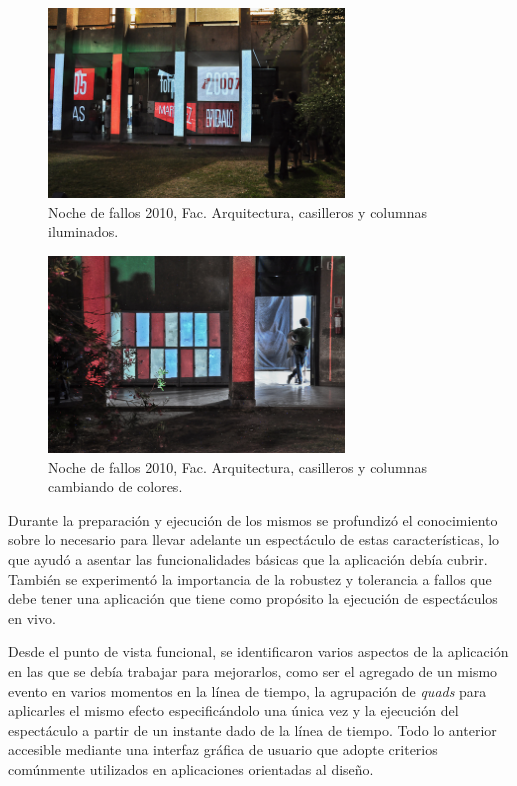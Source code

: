 \begin{figure}[H]
  \centering
    \includegraphics[width=0.7\textwidth]{./Cap7_conclusiones/Arqui2.jpg}
  \caption[http://www.farq.edu.uy/patio/conferencias-exposiciones-y-seminarios/noche-de-fallos-7.html]{Noche de fallos 2010, Fac. Arquitectura, casilleros y columnas iluminados.}
  \label{fig:Arquitectura2}
\end{figure}

\begin{figure}[H]
  \centering
    \includegraphics[width=0.7\textwidth]{./Cap7_conclusiones/Arqui3.jpg}
  \caption[http://www.farq.edu.uy/patio/conferencias-exposiciones-y-seminarios/noche-de-fallos-7.html]{Noche de fallos 2010, Fac. Arquitectura, casilleros y columnas cambiando de colores.}
  \label{fig:Arquitectura3}
\end{figure}

Durante la preparación y ejecución de los mismos se profundizó el conocimiento sobre lo necesario para llevar adelante un espectáculo de estas características, lo que ayudó a asentar las funcionalidades básicas que la aplicación debía cubrir. También se experimentó la importancia de la robustez y tolerancia a fallos que debe tener una aplicación que tiene como propósito la ejecución de espectáculos en vivo.

Desde el punto de vista funcional, se identificaron varios aspectos de la aplicación en las que se debía trabajar para mejorarlos, como ser el agregado de un mismo evento en varios momentos en la línea de tiempo, la agrupación de \emph{quads} para aplicarles el mismo efecto especificándolo una única vez y la ejecución del espectáculo a partir de un instante dado de la línea de tiempo. Todo lo anterior accesible mediante una interfaz gráfica de usuario que adopte criterios comúnmente utilizados en aplicaciones orientadas al diseño.

